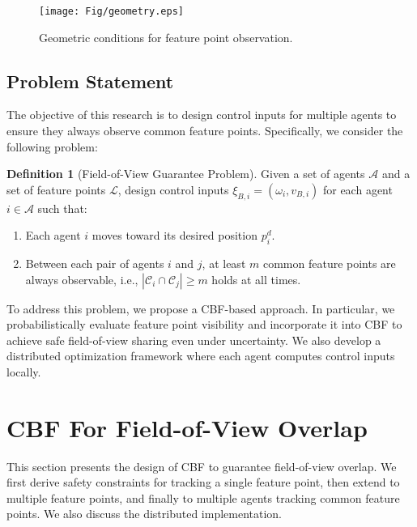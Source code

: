 \documentclass[fleqn,10pt,twocolumn]{SICE_FES25}
\theoremstyle{definition}
\newtheorem{definition}{Definition}
\theoremstyle{plain}
\begin{document}
\begin{figure}[ht]
\begin{center}
\texttt{[image: Fig/geometry.eps]}
\caption{\label{fig:geometry} Geometric conditions for feature point observation.}
\vspace{-6mm}
\end{center}
\end{figure}

\subsection{Problem Statement}

The objective of this research is to design control inputs for multiple agents to ensure they always observe common feature points. Specifically, we consider the following problem:

\begin{definition}[Field-of-View Guarantee Problem]
Given a set of agents $\mathcal{A}$ and a set of feature points $\mathcal{L}$, design control inputs $\xi_{B,i} = (\omega_i, v_{B,i})$ for each agent $i \in \mathcal{A}$ such that:
\begin{enumerate}
\item Each agent $i$ moves toward its desired position $p_i^d$.
\item Between each pair of agents $i$ and $j$, at least $m$ common feature points are always observable, i.e., $|{\mathcal{C}}_i \cap {\mathcal{C}}_j| \geq m$ holds at all times.
\end{enumerate}
\end{definition}

To address this problem, we propose a CBF-based approach. In particular, we probabilistically evaluate feature point visibility and incorporate it into CBF to achieve safe field-of-view sharing even under uncertainty. We also develop a distributed optimization framework where each agent computes control inputs locally.

\section{CBF For Field-of-View Overlap}

This section presents the design of CBF to guarantee field-of-view overlap. We first derive safety constraints for tracking a single feature point, then extend to multiple feature points, and finally to multiple agents tracking common feature points. We also discuss the distributed implementation.
\end{document}
